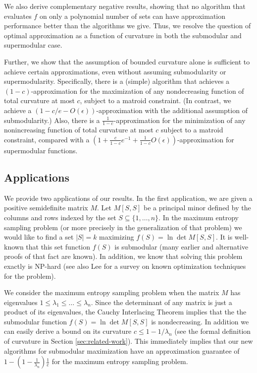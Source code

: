 \documentclass{article}
\theoremstyle{definition}
\begin{document}
We also derive complementary negative results, showing that no algorithm that evaluates $f$ on only a polynomial number of sets can have approximation performance better than the algorithms we give.  Thus, we resolve the question of optimal approximation as a function of curvature in both the submodular and supermodular case.





Further, we show that the assumption of bounded curvature alone is sufficient to achieve certain approximations, even without assuming submodularity or supermodularity. Specifically, there is a (simple) algorithm that achieves a $(1-c)$-approximation for the maximization of any nondecreasing function of total curvature at most $c$, subject to a matroid constraint. (In contrast, we achieve a $(1-c/e-O(\epsilon))$-approximation with the additional assumption of submodularity.) Also, there is a $\frac{1}{1-c}$-approximation for the minimization of any  nonincreasing function of total curvature at most $c$ subject to a matroid constraint, compared with a $(1 + \frac{c}{1-c}  e^{-1} + \frac{1}{1-c} O(\epsilon))$-approximation for supermodular functions.


\subsection{Applications}
We provide two applications of our results.  In the first application, we are given a positive semidefinite matrix $M$. Let $M[S,S]$ be a principal minor defined by the columns and rows indexed by the set $S\subseteq \{1,\dots,n\}$. In the maximum entropy sampling problem (or more precisely in the generalization of that problem) we would like to find a set $|S|=k$ maximizing $f(S)=\ln \det M[S,S]$. It is well-known that this set function $f(S)$ is submodular \cite{Kelmans1983} (many earlier and alternative proofs of that fact are known). In addition, we know that solving this problem exactly is NP-hard \cite{Lee1996} (see also Lee \cite{Lee2002} for a survey on known optimization techniques for the problem).

We consider the maximum entropy sampling problem when the matrix $M$ has eigenvalues $1\le \lambda_1\le \dots\le \lambda_n$. Since the determinant of any matrix is just a product of its eigenvalues, the Cauchy Interlacing Theorem implies that the  the submodular function $f(S)=\ln \det M[S,S]$ is nondecreasing. In addition we can easily derive a bound on its curvature $c\le 1-1/\lambda_n$ (see the formal definition of curvature in Section \ref{sec:related-work}).  This immediately implies that our new algorithms for submodular maximization have an approximation guarantee of $1 - \left(1-\frac{1}{\lambda_n}\right) \frac{1}{e}$ for the maximum entropy sampling problem.
\end{document}
